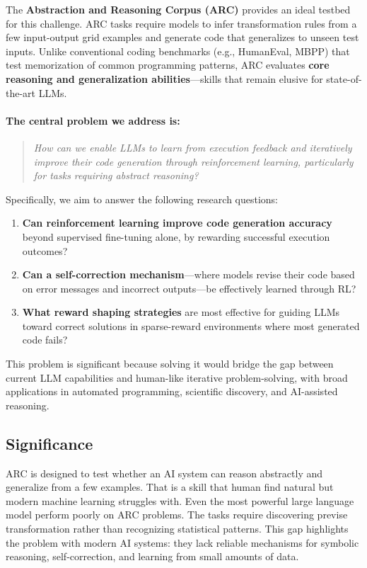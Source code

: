 \documentclass[11pt,letterpaper]{article}
\begin{document}
The \textbf{Abstraction and Reasoning Corpus (ARC)} provides an ideal testbed for this challenge. ARC tasks require models to infer transformation rules from a few input-output grid examples and generate code that generalizes to unseen test inputs. Unlike conventional coding benchmarks (e.g., HumanEval, MBPP) that test memorization of common programming patterns, ARC evaluates \textbf{core reasoning and generalization abilities}---skills that remain elusive for state-of-the-art LLMs.

\paragraph{\textbf{The central problem we address is:}}

\begin{quote}
    \textit{How can we enable LLMs to learn from execution feedback and iteratively improve their code generation through reinforcement learning, particularly for tasks requiring abstract reasoning?}
\end{quote}

Specifically, we aim to answer the following research questions:

\begin{enumerate}
    \item \textbf{Can reinforcement learning improve code generation accuracy} beyond supervised fine-tuning alone, by rewarding successful execution outcomes?
    
    \item \textbf{Can a self-correction mechanism}---where models revise their code based on error messages and incorrect outputs---be effectively learned through RL?
    
    \item \textbf{What reward shaping strategies} are most effective for guiding LLMs toward correct solutions in sparse-reward environments where most generated code fails?
\end{enumerate}

This problem is significant because solving it would bridge the gap between current LLM capabilities and human-like iterative problem-solving, with broad applications in automated programming, scientific discovery, and AI-assisted reasoning.

\subsection{Significance}
ARC is designed to test whether an AI system can reason abstractly and generalize from a few examples. That is a skill that human find natural but modern machine learning struggles with. Even the most powerful large language model perform poorly on ARC problems. The tasks require discovering previse transformation rather than recognizing statistical patterns. This gap highlights the problem with modern AI systems: they lack reliable mechanisms for symbolic reasoning, self-correction, and learning from small amounts of data.
\end{document}

